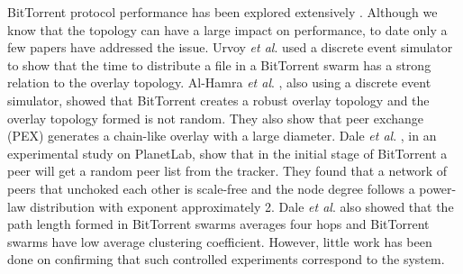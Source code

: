 BitTorrent protocol performance has been explored extensively \cite{guo2005measurements}\cite{legout2006rarest}\cite{pouwelse2004measurement}\cite{tian2007modeling}\cite{li2010measurement}\cite{zhang2010bittorrent}.  
Although we know that the topology can have a large impact on performance, to date only a few papers have addressed the issue.
Urvoy \textit{et al}. \cite{urvoy2007impact} used a discrete event simulator to show that the time to distribute a file in a BitTorrent swarm has a strong relation to the overlay topology.  
Al-Hamra \textit{et al}. \cite{al2007understanding}, also using a discrete event simulator, showed that BitTorrent creates a robust overlay topology and the overlay topology formed is not random. 
They also show that peer exchange (PEX) generates a chain-like overlay with a large diameter. 
Dale \textit{et al}. \cite{dale2008evolution}, in an experimental study on PlanetLab, show that in the initial stage of BitTorrent a peer will get a random peer list from the tracker. 
They found that a network of peers that unchoked each other is scale-free and the node degree follows a power-law distribution with exponent approximately 2. 
Dale \textit{et al}. \cite{dale2008evolution} also showed that the path length formed in BitTorrent swarms averages four hops and BitTorrent swarms have low average clustering coefficient.  
However, little work has been done on confirming that such controlled experiments correspond to the system. %

